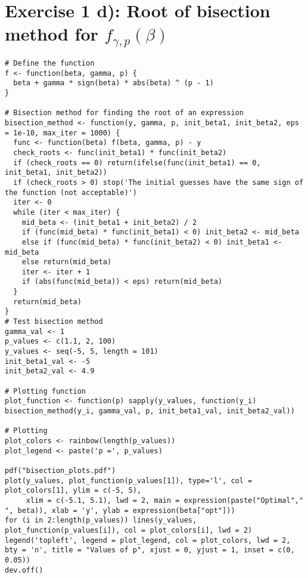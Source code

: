 \section*{Exercise 1 d): Root of bisection method for $f_{\gamma, p}(\beta)$}
\begin{tcolorbox}[colback=white!95!black,colframe=white!50!black]
\begin{lstlisting}[caption={Exercise 1d}, label={lst:bisection}]
# Define the function
f <- function(beta, gamma, p) {
  beta + gamma * sign(beta) * abs(beta) ^ (p - 1)
}

# Bisection method for finding the root of an expression
bisection_method <- function(y, gamma, p, init_beta1, init_beta2, eps = 1e-10, max_iter = 1000) {
  func <- function(beta) f(beta, gamma, p) - y
  check_roots <- func(init_beta1) * func(init_beta2)
  if (check_roots == 0) return(ifelse(func(init_beta1) == 0, init_beta1, init_beta2))
  if (check_roots > 0) stop('The initial guesses have the same sign of the function (not acceptable)')
  iter <- 0
  while (iter < max_iter) {
    mid_beta <- (init_beta1 + init_beta2) / 2 
    if (func(mid_beta) * func(init_beta1) < 0) init_beta2 <- mid_beta
    else if (func(mid_beta) * func(init_beta2) < 0) init_beta1 <- mid_beta
    else return(mid_beta)
    iter <- iter + 1
    if (abs(func(mid_beta)) < eps) return(mid_beta)
  }
  return(mid_beta)
}
# Test bisection method
gamma_val <- 1
p_values <- c(1.1, 2, 100)
y_values <- seq(-5, 5, length = 101)
init_beta1_val <- -5
init_beta2_val <- 4.9

# Plotting function
plot_function <- function(p) sapply(y_values, function(y_i) bisection_method(y_i, gamma_val, p, init_beta1_val, init_beta2_val))

# Plotting
plot_colors <- rainbow(length(p_values))
plot_legend <- paste('p =', p_values)

pdf("bisection_plots.pdf")
plot(y_values, plot_function(p_values[1]), type='l', col = plot_colors[1], ylim = c(-5, 5), 
     xlim = c(-5.1, 5.1), lwd = 2, main = expression(paste("Optimal"," ", beta)), xlab = 'y', ylab = expression(beta["opt"]))
for (i in 2:length(p_values)) lines(y_values, plot_function(p_values[i]), col = plot_colors[i], lwd = 2)
legend('topleft', legend = plot_legend, col = plot_colors, lwd = 2, bty = 'n', title = "Values of p", xjust = 0, yjust = 1, inset = c(0, 0.05))
dev.off()
\end{lstlisting}
\end{tcolorbox}
\vspace{60mm}
